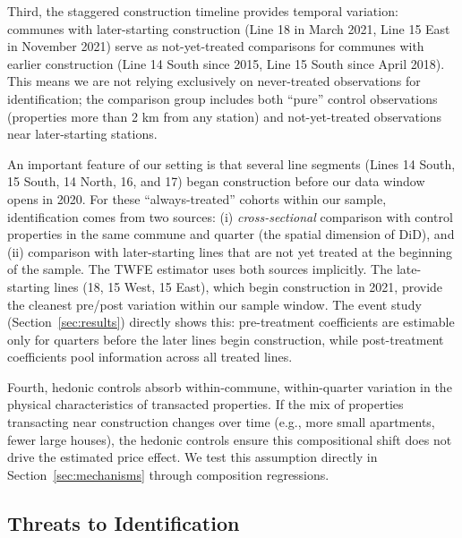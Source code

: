 \documentclass[12pt]{article}
\begin{document}
Third, the staggered construction timeline provides temporal variation: communes with later-starting construction (Line 18 in March 2021, Line 15 East in November 2021) serve as not-yet-treated comparisons for communes with earlier construction (Line 14 South since 2015, Line 15 South since April 2018). This means we are not relying exclusively on never-treated observations for identification; the comparison group includes both ``pure'' control observations (properties more than 2 km from any station) and not-yet-treated observations near later-starting stations.

An important feature of our setting is that several line segments (Lines 14 South, 15 South, 14 North, 16, and 17) began construction before our data window opens in 2020. For these ``always-treated'' cohorts within our sample, identification comes from two sources: (i) \textit{cross-sectional} comparison with control properties in the same commune and quarter (the spatial dimension of DiD), and (ii) comparison with later-starting lines that are not yet treated at the beginning of the sample. The TWFE estimator uses both sources implicitly. The late-starting lines (18, 15 West, 15 East), which begin construction in 2021, provide the cleanest pre/post variation within our sample window. The event study (Section~\ref{sec:results}) directly shows this: pre-treatment coefficients are estimable only for quarters before the later lines begin construction, while post-treatment coefficients pool information across all treated lines.

Fourth, hedonic controls absorb within-commune, within-quarter variation in the physical characteristics of transacted properties. If the mix of properties transacting near construction changes over time (e.g., more small apartments, fewer large houses), the hedonic controls ensure this compositional shift does not drive the estimated price effect. We test this assumption directly in Section~\ref{sec:mechanisms} through composition regressions.

\subsection{Threats to Identification}
\end{document}
